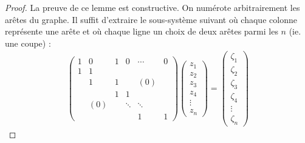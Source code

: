 \begin{proof}
La preuve de ce lemme est constructive. On numérote arbitrairement les arêtes du graphe. Il suffit d'extraire le sous-système suivant où chaque colonne représente une arête et où chaque ligne un choix de deux arêtes parmi les $n$ (ie. une coupe) :
\begin{gather}\label{Système linéaire extrait}
  \left(
  \begin{array}{cccccc}
    1 & 0   & 1 & 0      & \cdots & 0 \\
    1 & 1   &   &        &        &   \\
      & 1   & 1 &        & (0)    &   \\
      &     & 1 & 1      &        &   \\
      & (0) &   & \ddots & \ddots &   \\
      &     &   &        & 1      & 1
  \end{array} \right)
  \left(
  \begin{array}{c}
    z_1 \\
    z_2 \\
    z_3 \\
    z_4 \\
    \vdots \\
    z_n
  \end{array} \right)
  =
  \left(
  \begin{array}{c}
    \zeta_1 \\
    \zeta_2 \\
    \zeta_3 \\
    \zeta_4 \\
    \vdots  \\
    \zeta_n
  \end{array} \right)
\end{gather}


\end{proof}
